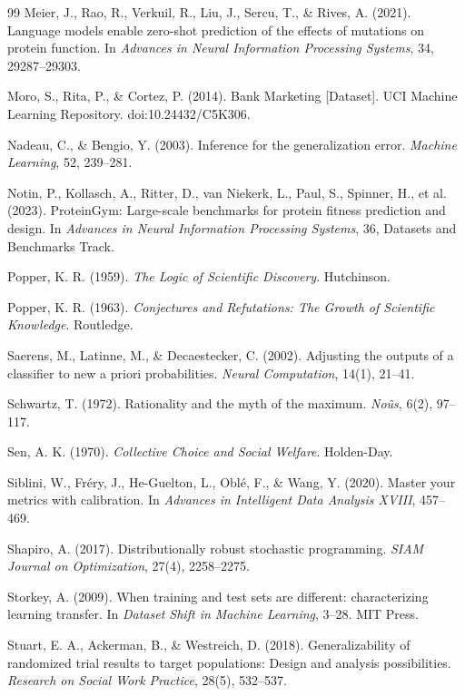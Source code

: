 \documentclass[11pt]{article}
\theoremstyle{remark}
\begin{document}
\begin{thebibliography}{99}
Meier, J., Rao, R., Verkuil, R., Liu, J., Sercu, T., \& Rives, A. (2021).
Language models enable zero-shot prediction of the effects of mutations on protein function.
In \emph{Advances in Neural Information Processing Systems}, 34, 29287--29303.

Moro, S., Rita, P., \& Cortez, P. (2014).
Bank Marketing [Dataset].
UCI Machine Learning Repository. doi:10.24432/C5K306.

Nadeau, C., \& Bengio, Y. (2003).
Inference for the generalization error.
\emph{Machine Learning}, 52, 239--281.

Notin, P., Kollasch, A., Ritter, D., van Niekerk, L., Paul, S., Spinner, H., et al. (2023).
ProteinGym: Large-scale benchmarks for protein fitness prediction and design.
In \emph{Advances in Neural Information Processing Systems}, 36, Datasets and Benchmarks Track.

Popper, K. R. (1959).
\emph{The Logic of Scientific Discovery}.
Hutchinson.

Popper, K. R. (1963).
\emph{Conjectures and Refutations: The Growth of Scientific Knowledge}.
Routledge.

Saerens, M., Latinne, M., \& Decaestecker, C. (2002).
Adjusting the outputs of a classifier to new a priori probabilities.
\emph{Neural Computation}, 14(1), 21--41.

Schwartz, T. (1972).
Rationality and the myth of the maximum.
\emph{No\^us}, 6(2), 97--117.

Sen, A. K. (1970).
\emph{Collective Choice and Social Welfare}.
Holden-Day.

Siblini, W., Fr\'ery, J., He-Guelton, L., Obl\'e, F., \& Wang, Y. (2020).
Master your metrics with calibration.
In \emph{Advances in Intelligent Data Analysis XVIII}, 457--469.

Shapiro, A. (2017).
Distributionally robust stochastic programming.
\emph{SIAM Journal on Optimization}, 27(4), 2258--2275.

Storkey, A. (2009).
When training and test sets are different: characterizing learning transfer.
In \emph{Dataset Shift in Machine Learning}, 3--28. MIT Press.

Stuart, E. A., Ackerman, B., \& Westreich, D. (2018).
Generalizability of randomized trial results to target populations: Design and
analysis possibilities.
\emph{Research on Social Work Practice}, 28(5), 532--537.


\end{thebibliography}
\end{document}
